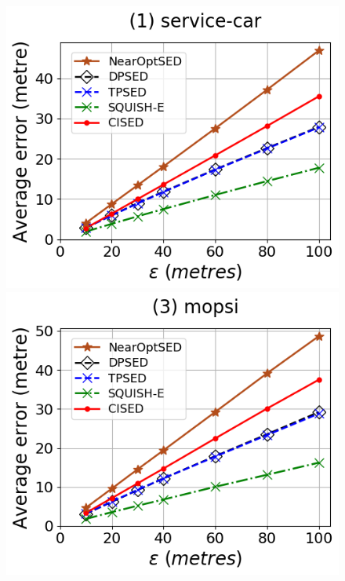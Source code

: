 \begin{figure}[tb!]
	\centering
	\includegraphics[scale=0.315]{Figures/Exp-error-epsilon-service.png}	\hspace{1ex}
	\includegraphics[scale=0.315]{Figures/Exp-error-epsilon-mopsi.png}		\hspace{1ex}

\end{figure}
